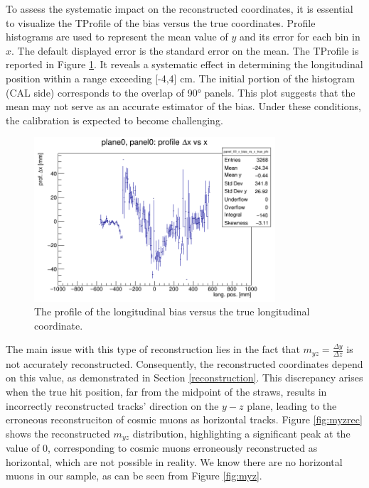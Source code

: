 To assess the systematic impact on the 
reconstructed coordinates, it is essential 
to visualize the TProfile of the bias versus 
the true coordinates. 
Profile histograms are used to represent the 
mean value of $y$ and its error for each bin in $x$. 
The default displayed error is the standard 
error on the mean. 
The TProfile is reported in Figure \ref{fig:profile}. 
It reveals a systematic effect in determining the 
longitudinal position within a range exceeding 
[-4,4] cm. The initial portion of the 
histogram (CAL side) 
corresponds to the overlap of 90° panels. 
This plot suggests that the mean may not 
serve as an accurate estimator of the bias. 
Under these conditions, the calibration is 
expected to become challenging.
\begin{figure}[!h]
    \centering
    \includegraphics[width=0.8\textwidth]{figures/png/panel_00_x_bias_vs_x_prof.png}
    \caption[The profile of the longitudinal bias versus the true longitudinal coordinate.]{The profile of the longitudinal bias versus the true longitudinal coordinate.}
    \label{fig:profile}
\end{figure}
The main issue with this type of reconstruction 
lies in the fact that $m_{yz}=\frac{\Delta y}{\Delta z}$ 
is not accurately reconstructed. Consequently, 
the reconstructed coordinates depend on this 
value, as demonstrated in Section \ref{reconstruction}. 
This discrepancy arises when the true hit 
position, far from the midpoint of the straws, 
results in incorrectly reconstructed tracks'
direction on the $y-z$ plane, leading to the erroneous 
reconstruciton of cosmic muons as horizontal tracks.
Figure \ref{fig:myzrec} shows the 
reconstructed $m_{yz}$ distribution, highlighting 
a significant peak at the value of 0, 
corresponding to cosmic muons erroneously 
reconstructed as horizontal, which 
are not possible in reality. We know there are 
no horizontal muons in our sample, as can be seen 
from Figure \ref{fig:myz}.


